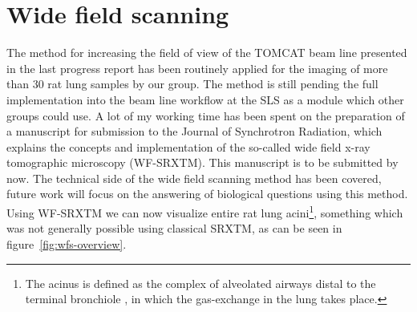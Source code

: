 \documentclass[a4paper,twoside,DIV=calc]{scrartcl}
\begin{document}

\section{Wide field scanning}\label{sec:wfs}
The method for increasing the field of view of the TOMCAT beam line presented in the last progress report has been routinely applied for the imaging of more than 30 rat lung samples by our group. The method is still pending the full implementation into the beam line workflow at the SLS as a module which other groups could use. A lot of my working time has been spent on the preparation of a manuscript for submission to the Journal of Synchrotron Radiation, which explains the concepts and implementation of the so-called wide field x-ray tomographic microscopy (WF-SRXTM). This manuscript is to be submitted by now. The technical side of the wide field scanning method has been covered, future work will focus on the answering of biological questions using this method. Using WF-SRXTM we can now visualize entire rat lung acini\footnote{The acinus is defined as the complex of alveolated airways distal to the terminal bronchiole \cite{Rodriguez1987}, in which the gas-exchange in the lung takes place.}, something which was not generally possible using classical SRXTM, as can be seen in figure~\ref{fig:wfs-overview}.
\end{document}
